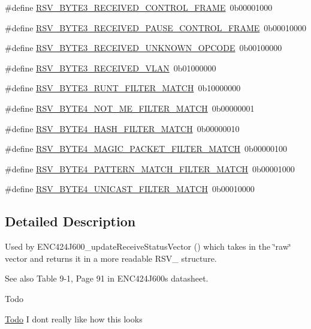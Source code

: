 \begin{DoxyCompactItemize}
\item 
\#define \mbox{\hyperlink{group__rsv_bits_ga38e402fa239e391e46b28b5c6681dfe9}{R\+S\+V\+\_\+\+B\+Y\+T\+E3\+\_\+\+R\+E\+C\+E\+I\+V\+E\+D\+\_\+\+C\+O\+N\+T\+R\+O\+L\+\_\+\+F\+R\+A\+ME}}~0b00001000
\item 
\#define \mbox{\hyperlink{group__rsv_bits_ga79ecf389081d30616847cae6cb5b7a62}{R\+S\+V\+\_\+\+B\+Y\+T\+E3\+\_\+\+R\+E\+C\+E\+I\+V\+E\+D\+\_\+\+P\+A\+U\+S\+E\+\_\+\+C\+O\+N\+T\+R\+O\+L\+\_\+\+F\+R\+A\+ME}}~0b00010000
\item 
\#define \mbox{\hyperlink{group__rsv_bits_ga1d598b4ddbd78ad09795a0f02845c85f}{R\+S\+V\+\_\+\+B\+Y\+T\+E3\+\_\+\+R\+E\+C\+E\+I\+V\+E\+D\+\_\+\+U\+N\+K\+N\+O\+W\+N\+\_\+\+O\+P\+C\+O\+DE}}~0b00100000
\item 
\#define \mbox{\hyperlink{group__rsv_bits_gaa1c5e51e1fc7daa0180df5af3294177f}{R\+S\+V\+\_\+\+B\+Y\+T\+E3\+\_\+\+R\+E\+C\+E\+I\+V\+E\+D\+\_\+\+V\+L\+AN}}~0b01000000
\item 
\#define \mbox{\hyperlink{group__rsv_bits_gaf4ae3b272d5eb92f8d38f183846445b3}{R\+S\+V\+\_\+\+B\+Y\+T\+E3\+\_\+\+R\+U\+N\+T\+\_\+\+F\+I\+L\+T\+E\+R\+\_\+\+M\+A\+T\+CH}}~0b10000000
\item 
\#define \mbox{\hyperlink{group__rsv_bits_ga27160ef6ffdcaa803c8ca26cb1c95499}{R\+S\+V\+\_\+\+B\+Y\+T\+E4\+\_\+\+N\+O\+T\+\_\+\+M\+E\+\_\+\+F\+I\+L\+T\+E\+R\+\_\+\+M\+A\+T\+CH}}~0b00000001
\item 
\#define \mbox{\hyperlink{group__rsv_bits_ga68476e62976ec265592a312ba2aefab1}{R\+S\+V\+\_\+\+B\+Y\+T\+E4\+\_\+\+H\+A\+S\+H\+\_\+\+F\+I\+L\+T\+E\+R\+\_\+\+M\+A\+T\+CH}}~0b00000010
\item 
\#define \mbox{\hyperlink{group__rsv_bits_ga8fc9b8804e9cb35a7c8ae4b5bc5065c1}{R\+S\+V\+\_\+\+B\+Y\+T\+E4\+\_\+\+M\+A\+G\+I\+C\+\_\+\+P\+A\+C\+K\+E\+T\+\_\+\+F\+I\+L\+T\+E\+R\+\_\+\+M\+A\+T\+CH}}~0b00000100
\item 
\#define \mbox{\hyperlink{group__rsv_bits_ga81251d8615bd5ed24a75cc03a4803e3f}{R\+S\+V\+\_\+\+B\+Y\+T\+E4\+\_\+\+P\+A\+T\+T\+E\+R\+N\+\_\+\+M\+A\+T\+C\+H\+\_\+\+F\+I\+L\+T\+E\+R\+\_\+\+M\+A\+T\+CH}}~0b00001000
\item 
\#define \mbox{\hyperlink{group__rsv_bits_gab864c929aa2a7b2423d54ff554356355}{R\+S\+V\+\_\+\+B\+Y\+T\+E4\+\_\+\+U\+N\+I\+C\+A\+S\+T\+\_\+\+F\+I\+L\+T\+E\+R\+\_\+\+M\+A\+T\+CH}}~0b00010000
\end{DoxyCompactItemize}


\subsection{Detailed Description}
Used by E\+N\+C424\+J600\+\_\+update\+Receive\+Status\+Vector () which takes in the \char`\"{}raw\char`\"{} vector and returns it in a more readable R\+S\+V\+\_\+ structure. \begin{DoxySeeAlso}{See also}
Table 9-\/1, Page 91 in E\+N\+C424\+J600\textquotesingle{}s datasheet. 
\end{DoxySeeAlso}
\begin{DoxyRefDesc}{Todo}
\item[\mbox{\hyperlink{todo__todo000005}{Todo}}]I don\textquotesingle{}t really like how this looks\end{DoxyRefDesc}


